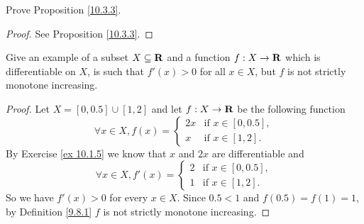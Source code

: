 \begin{exercise}\label{ex 10.3.4}
    Prove Proposition \ref{10.3.3}.
\end{exercise}

\begin{proof}
    See Proposition \ref{10.3.3}.
\end{proof}

\begin{exercise}\label{ex 10.3.5}
    Give an example of a subset \(X \subseteq \mathbf{R}\) and a function \(f : X \to \mathbf{R}\) which is differentiable on \(X\), is such that \(f'(x) > 0\) for all \(x \in X\), but \(f\) is not strictly monotone increasing.
\end{exercise}

\begin{proof}
    Let \(X = [0, 0.5] \cup [1, 2]\) and let \(f : X \to \mathbf{R}\) be the following function
    \[
        \forall x \in X, f(x) = \begin{cases}
            2x & \text{if } x \in [0, 0.5], \\
            x  & \text{if } x \in [1, 2].
        \end{cases}
    \]
    By Exercise \ref{ex 10.1.5} we know that \(x\) and \(2x\) are differentiable and
    \[
        \forall x \in X, f'(x) = \begin{cases}
            2 & \text{if } x \in [0, 0.5], \\
            1 & \text{if } x \in [1, 2].
        \end{cases}
    \]
    So we have \(f'(x) > 0\) for every \(x \in X\).
    Since \(0.5 < 1\) and \(f(0.5) = f(1) = 1\), by Definition \ref{9.8.1} \(f\) is not strictly monotone increasing.
\end{proof}